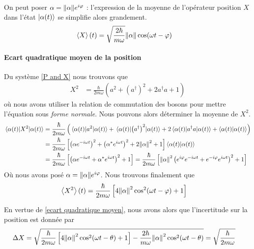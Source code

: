 \documentclass[11pt,oneside,a4paper]{article}
\newcommand{\h}{\ensuremath{\hbar}}
\begin{document}
On peut poser $\alpha = \norm{\alpha}e^{i\varphi}$ : l'expression de la moyenne de l'opérateur position $X$ dans l'état $\ket{\alpha(t)}$ se simplifie alors grandement.
\begin{align}
  \label{mean position}
  \expval{X}(t)&= \sqrt{\frac{2\h}{m\omega}}\norm{\alpha}\cos(\omega t-\varphi)
\end{align}

\paragraph{Ecart quadratique moyen de la position}

Du système \eqref{P and X} nous trouvons que 
\begin{align}
  X^2 &= \frac{\h}{2m\omega}\left(a^2+\left(a^\dagger\right)^2+2a^\dagger a+1\right)
\end{align}
où nous avons utiliser la relation de commutation des bosons pour mettre l'équation sous \emph{forme normale}. Nous pouvons alors déterminer la moyenne de $X^2$.
\begin{align}
  \expval{X^2}{\alpha(t)} &= \frac{\h}{2m\omega} \left(\expval{a^2}{\alpha(t)}+\expval{\left(a^\dagger\right)^2}{\alpha(t)}+2\expval{a^\dagger a}{\alpha(t)}+\braket{\alpha(t)}\right)\\
  &= \frac{\h}{2m\omega}\left[\left(\alpha e^{-i\omega t}\right)^2+\left(\alpha^*e^{i\omega t}\right)^2 +2\norm{\alpha}^2+1\right]\braket{\alpha(t)}\\
  &= \frac{\h}{2m\omega}\left[\left(\alpha e^{-i\omega t}+\alpha^*e^{i\omega t}\right)^2+1\right] = \frac{\h}{2m\omega}\left[\norm{\alpha}^2\left(e^{i\varphi}e^{-i\omega t}+e^{-i\varphi}e^{i\omega t}\right)^2+1\right]\label{Mean X^2}
\end{align}
Où nous avons posé $\alpha = \norm{\alpha}e^{i\varphi}$. Nous trouvons finalement que 
\begin{align}
  \expval{X^2}(t) &= \frac{\h}{2m\omega}\left[4\norm{\alpha}^2\cos^2(\omega t-\varphi)+1\right]
\end{align}

En vertue de \eqref{ecart quadratique moyen}, nous avons alors que l'incertitude sur la position est donnée par
\begin{align}
  \Delta X &= \sqrt{\frac{\h}{2m\omega}\left[4\norm{\alpha}^2\cos^2(\omega t-\theta)+1\right] - \frac{2\h}{m\omega}\norm{\alpha}^2\cos^2(\omega t-\theta)} = \sqrt{\frac{\h}{2m\omega}}
\end{align}
\end{document}

